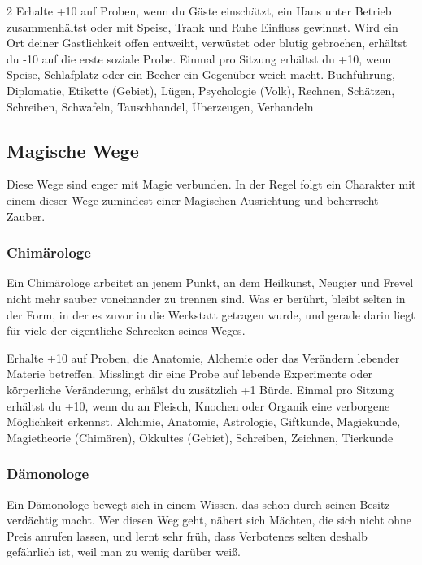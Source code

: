 {\begin{multicols*}{2}
        \wegespielwertebox
        {Erhalte +10 auf Proben, wenn du Gäste einschätzt, ein Haus unter Betrieb zusammenhältst oder mit Speise, Trank und Ruhe Einfluss gewinnst.}
        {Wird ein Ort deiner Gastlichkeit offen entweiht, verwüstet oder blutig gebrochen, erhältst du -10 auf die erste soziale Probe.}
        {Einmal pro Sitzung erhältst du +10, wenn Speise, Schlafplatz oder ein Becher ein Gegenüber weich macht.}
        {Buchführung, Diplomatie, Etikette (Gebiet), Lügen, Psychologie (Volk), Rechnen, Schätzen, Schreiben, Schwafeln, Tauschhandel, Überzeugen, Verhandeln}

        \subsection{Magische Wege}\label{subsec:wege-magisch}

        Diese Wege sind enger mit Magie verbunden. In der Regel folgt ein Charakter mit einem dieser Wege zumindest einer Magischen Ausrichtung und beherrscht Zauber.

        \subsubsection*{Chimärologe}
        Ein Chimärologe arbeitet an jenem Punkt, an dem Heilkunst, Neugier und Frevel nicht mehr sauber voneinander zu trennen sind. Was er berührt, bleibt selten in der Form, in der es zuvor in die Werkstatt getragen wurde, und gerade darin liegt für viele der eigentliche Schrecken seines Weges.

        \wegespielwertebox
        {Erhalte +10 auf Proben, die Anatomie, Alchemie oder das Verändern lebender Materie betreffen.}
        {Misslingt dir eine Probe auf lebende Experimente oder körperliche Veränderung, erhälst du zusätzlich +1 Bürde.}
        {Einmal pro Sitzung erhältst du +10, wenn du an Fleisch, Knochen oder Organik eine verborgene Möglichkeit erkennst.}
        {Alchimie, Anatomie, Astrologie, Giftkunde, Magiekunde, Magietheorie (Chimären), Okkultes (Gebiet), Schreiben, Zeichnen, Tierkunde}

        \subsubsection*{Dämonologe}
        Ein Dämonologe bewegt sich in einem Wissen, das schon durch seinen Besitz verdächtig macht. Wer diesen Weg geht, nähert sich Mächten, die sich nicht ohne Preis anrufen lassen, und lernt sehr früh, dass Verbotenes selten deshalb gefährlich ist, weil man zu wenig darüber weiß.


\end{multicols*}}
